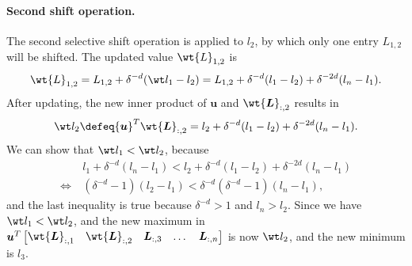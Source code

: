 \documentclass{article} %
\def\vu{{\bm{u}}}
\def\mL{{\bm{L}}}
\def\emL{{L}}
\begin{document}
\paragraph{Second shift operation.}
The second selective shift operation is applied to $l_2$, by which only one entry $\emL_{1,2}$ will be shifted. The updated value $\wt \emL_{1,2}$ is
\begin{equation*}
    \wt \emL_{1,2}
    = \emL_{1,2} + \delta^{-d} (\wt l_1 - l_2)
    = \emL_{1,2} + \delta^{-d} (l_1 - l_2) + \delta^{-2d} (l_n - l_1).
\end{equation*}
After updating, the new inner product of $\vu$ and $\wt \mL_{:,2}$ results in
\begin{equation*}
    \wt l_2 \defeq \vu^T \wt \mL_{:,2} = l_2 + \delta^{-d} (l_1 - l_2) + \delta^{-2d} (l_n - l_1).%
\end{equation*}
We can show that $\wt l_1 < \wt l_2$, because
\begin{align*}
    &l_1 + \delta^{-d} (l_n - l_1) < l_2 + \delta^{-d} (l_1 - l_2) + \delta^{-2d} (l_n - l_1)\\
    \iff~&
    (\delta^{-d}-1) (l_2 - l_1) < \delta^{-d}(\delta^{-d}-1) (l_n - l_1),
\end{align*}
and the last inequality is true because $\delta^{-d} > 1$ and $l_n > l_2$.
Since we have $\wt l_1 < \wt l_2$, and the new maximum in $\vu^T \begin{bmatrix} \wt \mL_{:,1} & \wt \mL_{:,2} & \mL_{:,3} & \dots & \mL_{:,n} \end{bmatrix}$ is now $\wt l_2$, and the new minimum is $l_3$.
\end{document}
